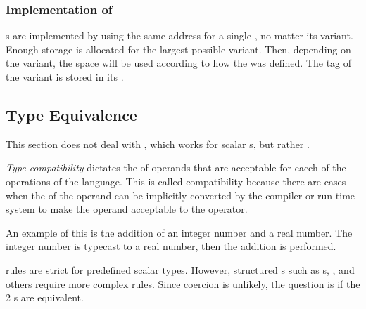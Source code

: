 \subsubsection{Implementation of }\label{subsubsec:Union_Types-Implementation}
s are implemented by using the same address for a single , no matter its variant.
Enough storage is allocated for the largest possible variant.
Then, depending on the variant, the space will be used according to how the  was defined.
The tag of the  variant is stored in its .

\subsection{Type Equivalence}\label{subsec:Type_Equivalence}
This section does not deal with , which works for scalar s, but rather .
\begin{definition}\label{def:Type_Compatibility}
  \emph{Type compatibility} dictates the  of operands that are acceptable for eacch of the operations of the language.
  This is called compatibility because there are cases when the  of the operand can be implicitly converted by the compiler or run-time system to make the operand acceptable to the operator.

  An example of this is the addition of an integer number and a real number.
  The integer number is typecast to a real number, then the addition is performed.
\end{definition}

 rules are strict for predefined scalar types.
However, structured s such as s, , and others require more complex rules.
Since  coercion is unlikely, the question is if the 2 s are equivalent.

